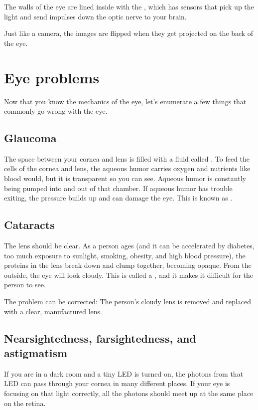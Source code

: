 The walls of the eye are lined inside with the , which has
 sensors that pick up the light and send impulses down the optic
nerve to your brain.

Just like a camera, the images are flipped when they get projected on
the back of the eye.

\section{Eye problems}

Now that you know the mechanics of the eye, let's enumerate a few
things that commonly go wrong with the eye.

\subsection{Glaucoma}

The space between your cornea and lens is filled with a fluid called
. To feed the cells of the cornea and lens,
the aqueous humor carries oxygen and nutrients like blood would, but
it is transparent so you can see. Aqueous humor is constantly being
pumped into and out of that chamber.  If aqueous humor has trouble
exiting, the pressure builds up and can damage the eye. This is known
as .

\subsection{Cataracts}

The lens should be clear. As a person ages (and it can be accelerated
by diabetes, too much exposure to sunlight, smoking, obesity, and high
blood pressure), the proteins in the lens break down and clump
together, becoming opaque. From the outside, the eye will look
cloudy. This is called a , and it makes it difficult
for the person to see.

The problem can be corrected: The person's cloudy lens is removed and
replaced with a clear, manufactured lens.

\subsection{Nearsightedness, farsightedness, and astigmatism}

If you are in a dark room and a tiny LED is turned on, the photons
from that LED can pass through your cornea in many different places.
If your eye is focusing on that light correctly, all the photons
should meet up at the same place on the retina.

